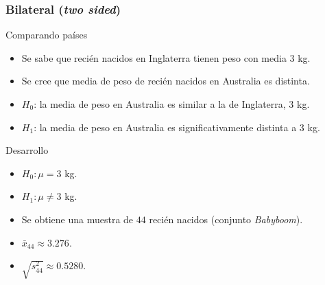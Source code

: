\documentclass[table]{beamer}
\begin{document}
\begin{frame}
    \frametitle{Bilateral (\emph{two sided})}
    \begin{exampleblock}{Comparando países}
        \begin{itemize}
            \item Se sabe que recién nacidos en Inglaterra tienen peso con media $3$ kg.
            \item Se cree que media de peso de recién nacidos en Australia es distinta.
            \item $H_{0}$: la media de peso en Australia es similar a la de Inglaterra, $3$ kg.
            \item $H_{1}$: la media de peso en Australia es significativamente distinta a $3$ kg.
        \end{itemize}
    \end{exampleblock}

\end{frame}

\begin{frame}
    \begin{block}{Desarrollo}
        \begin{itemize}
            \item $H_{0}: \mu = 3$ kg.
            \item $H_{1}: \mu \neq 3$ kg.
            \item Se obtiene una muestra de $44$ recién nacidos (conjunto \emph{Babyboom}).
            \item $\bar{x}_{44} \approx 3.276$.
            \item $\sqrt{s^{2}_{44}} \approx 0.5280$.
        \end{itemize}
    \end{block}
\end{frame}
\end{document}
